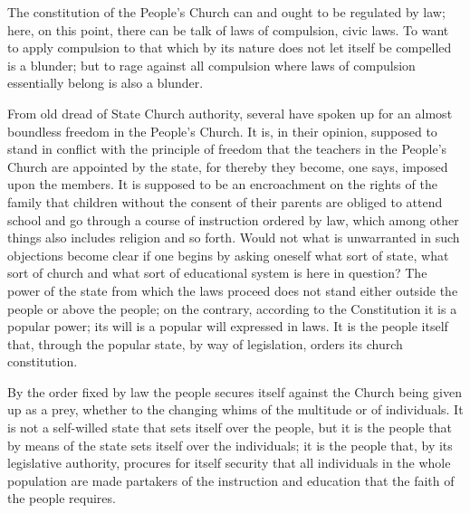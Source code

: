 \documentclass[12pt,a4paper,openany]{book}
\newcommand{\opage}[1]{\marginnote{\footnotesize\textit{[#1]}}}
\begin{document}
The constitution of the People's Church can and ought to be regulated by
law; here, on this point, there can be talk of laws of compulsion,
civic laws. To want to apply compulsion to that
which by its nature does not let itself be compelled is a blunder;
but to rage against all compulsion where laws of compulsion
essentially belong is also a blunder.

From old dread of State Church authority, several
have spoken up for an almost boundless freedom
in the People's Church. It is, in their opinion, supposed to stand
in conflict with the principle of freedom that the teachers in the People's Church
are appointed by the state, for thereby they become, one says,
imposed upon the members. It is supposed to be an encroachment
on the rights of the family that children without the consent of their parents
are obliged to attend school and go through a
course of instruction ordered by law, which among other things also
includes religion and so forth. Would not what is
\setcounter{footnote}{0}%
\opage{110}unwarranted in such objections become clear if
one begins by asking oneself what sort
of state, what sort of church and what sort
of educational system is here in question? The
power of the state from which the laws proceed does not stand either
outside the people or above the people; on the contrary, according to
the Constitution it is a popular power; its will is a popular will expressed
in laws. It is the people itself that, through
the popular state, by way of legislation, orders its
church constitution.

By the order fixed by law the people secures itself
against the Church being given up as a prey, whether to the changing whims of the multitude
or of individuals. It is not a
self-willed state that sets itself over the people, but it
is the people that by means of the state sets itself over the individuals;
it is the people that, by its legislative authority,
procures for itself security that all individuals in
the whole population are made partakers of the instruction
and education that the faith of the people requires.
\end{document}
